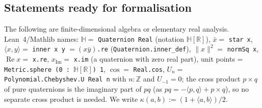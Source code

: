 \documentclass[11pt,reqno]{amsart}
\theoremstyle{definition}
\theoremstyle{remark}
\numberwithin{equation}{section}
\newcommand{\R}{\mathbb{R}}
\newcommand{\HH}{\mathbb{H}}
\newcommand{\Z}{\mathbb{Z}}
\newcommand{\re}{\operatorname{Re}}
\newcommand{\im}{\operatorname{Im}}
\newcommand{\ip}[2]{\langle #1,#2\rangle}
\begin{document}
\subsection{Statements ready for formalisation}\label{sec:ready}
The following are finite-dimensional algebra or elementary real analysis.  Lean~4/Mathlib names: $\HH=$
\texttt{Quaternion Real} (notation $\HH[\R]$), $\bar x=$ \texttt{star x}, $\ip xy=$ \texttt{inner x y} $=(x\bar y)$\texttt{.re}
(\texttt{Quaternion.inner\_def}), $\lVert x\rVert^2=$ \texttt{normSq x}, $\re x=$ \texttt{x.re}, $x_{\im}=$ \texttt{x.im} (a
quaternion with zero real part), unit points = \texttt{Metric.sphere (0 : }$\HH[\R]$\texttt{) 1}, $\cos=$ \texttt{Real.cos},
$U_n=$ \texttt{Polynomial.Chebyshev.U Real n} with $n:\Z$ and $U_{-1}=0$; the cross product $p\times q$ of pure quaternions is the
imaginary part of $pq$ (as $pq=-\ip pq+p\times q$), so no separate cross product is needed.  We write
$\kappa(a,b):=(1+\ip ab)/2$.
\end{document}
